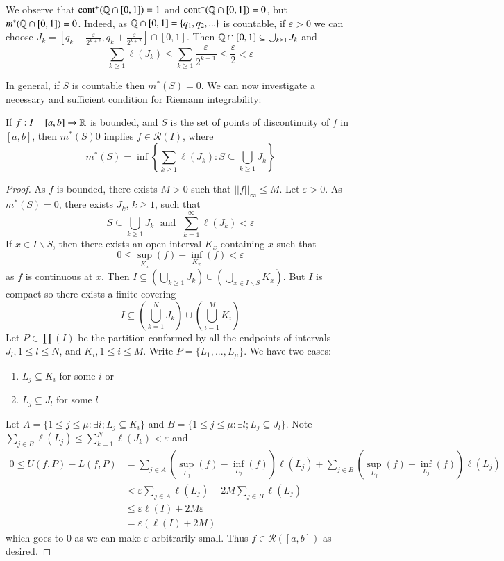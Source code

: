 \begin{example}
    We observe that $\text{cont}^+(\mathbb Q\cap [0,1]) = 1$ and $\text{cont}^-(\mathbb Q\cap [0,1]) = 0$, but $m^*(\mathbb Q\cap [0,1]) = 0$. Indeed, as $\mathbb Q\cap [0,1] = \{q_1,q_2,...\}$ is countable, if $\varepsilon > 0$ we can choose $J_k = \left[q_k - \frac{\varepsilon}{2^{k+2}}, q_k + \frac{\varepsilon}{2^{k+2}}\right]\cap[0,1]$. Then $\mathbb Q\cap[0,1] \subseteq \bigcup_{k\geq 1}J_k$ and $$\sum_{k\geq 1}\ell(J_k) \leq \sum_{k\geq 1}\frac{\varepsilon}{2^{k+1}} \leq \frac{\varepsilon}{2} < \varepsilon$$ 
\end{example}

In general, if $S$ is countable then $m^*(S) = 0$. We can now investigate a necessary and sufficient condition for Riemann integrability: 

\begin{proposition}\label{prop:4.2.12}
    If $f:I=[a,b]\rightarrow \mathbb R$ is bounded, and $S$ is the set of points of discontinuity of $f$ in $[a,b]$, then $m^*(S) 0$ implies $f \in \mathcal{R}(I)$, where $$m^*(S) = \inf\left\{\sum_{k\geq 1}\ell(J_k):S\subseteq \bigcup_{k\geq 1}J_k\right\}$$
\end{proposition}
\begin{proof}
    As $f$ is bounded, there exists $M > 0$ such that $||f||_{\infty} \leq M$. Let $\varepsilon > 0$. As $m^*(S) = 0$, there exists $J_k$, $k\geq 1$, such that $$S \subseteq \bigcup_{k\geq 1}J_k\;\text{ and }\;\sum_{k=1}^{\infty}\ell(J_k) < \varepsilon$$ If $x \in I\backslash S$, then there exists an open interval $K_x$ containing $x$ such that $$0 \leq \sup_{K_x}(f) - \inf_{K_x}(f) < \varepsilon$$ as $f$ is continuous at $x$. Then $I \subseteq \left(\bigcup_{k\geq 1}J_k\right) \cup\left(\bigcup_{x \in I\backslash S}K_x\right)$. But $I$ is compact so there exists a finite covering $$I \subseteq \left(\bigcup_{k=1}^NJ_k\right) \cup\left(\bigcup_{i=1}^MK_i\right)$$ Let $P \in \prod(I)$ be the partition conformed by all the endpoints of intervals $J_l, 1 \leq l \leq N$, and $K_i, 1 \leq i \leq M$. Write $P = \{L_1,...,L_{\mu}\}$. We have two cases: \begin{enumerate}
        \item $L_j \subseteq K_i$ for some $i$ or 
        \item $L_j \subseteq J_l$ for some $l$
    \end{enumerate}
    Let $A = \{1\leq j\leq \mu:\exists i;L_j \subseteq K_i\}$ and $B = \{1\leq j \leq \mu:\exists l;L_j\subseteq J_l\}$. Note $\sum_{j\in B}\ell(L_j) \leq \sum_{k=1}^N\ell(J_k)<\varepsilon$ and \begin{align*}
        0 \leq U(f,P) - L(f,P) &= \sum_{j \in A}\left(\sup_{L_j}(f) - \inf_{L_j}(f)\right)\ell(L_j) + \sum_{j\in B}\left(\sup_{L_j}(f) - \inf_{L_j}(f)\right)\ell(L_j) \\
        &< \varepsilon\sum_{j\in A}\ell(L_j) + 2M\sum_{j\in B}\ell(L_j) \\
        &\leq \varepsilon \ell(I) + 2M\varepsilon \\
        &= \varepsilon(\ell(I)+2M)
    \end{align*}
    which goes to $0$ as we can make $\varepsilon$ arbitrarily small. Thus $f \in \mathcal{R}([a,b])$ as desired.
\end{proof}


